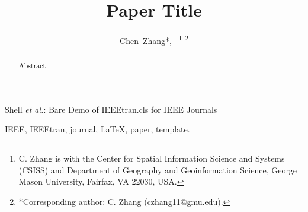 \documentclass[journal]{IEEEtran}
\begin{document}
  
  \title{Paper Title}

  \author{Chen~Zhang*,~
  \thanks{C. Zhang is with the Center for Spatial Information Science and Systems (CSISS) and Department of Geography and Geoinformation Science, George Mason University, Fairfax, VA 22030, USA.}
  \thanks{*Corresponding author: C. Zhang (czhang11@gmu.edu).}}

  {Shell \MakeLowercase{\textit{et al.}}: Bare Demo of IEEEtran.cls for IEEE Journals}

  \maketitle

  \begin{abstract}
    Abstract
  \end{abstract}
  \begin{IEEEkeywords}
    IEEE, IEEEtran, journal, \LaTeX, paper, template.
  \end{IEEEkeywords}

  \IEEEpeerreviewmaketitle

  
  
  
  
  

  
  
\end{document}
